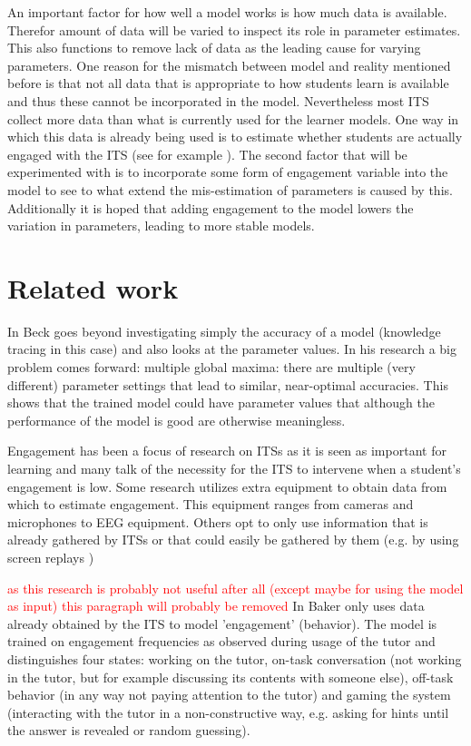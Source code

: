 \documentclass{article}
\newcommand\todo[1]{\textcolor{red}{#1}}
\begin{document}
An important factor for how well a model works is how much data is available. Therefor amount of data will be varied to inspect its role in parameter estimates. This also functions to remove lack of data as the leading cause for varying parameters.
One reason for the mismatch between model and reality mentioned before is that not all data that is appropriate to how students learn is available and thus these cannot be incorporated in the model. Nevertheless most ITS collect more data than what is currently used for the learner models. One way in which this data is already being used is to estimate whether students are actually engaged with the ITS (see for example \cite{offtaskmodel}). The second factor that will be experimented with is to incorporate some form of engagement variable into the model to see to what extend the mis-estimation of parameters is caused by this. Additionally it is hoped that adding engagement to the model lowers the variation in parameters, leading to more stable models.

\section{Related work}
In \cite{knowledgeproblem} Beck goes beyond investigating simply the accuracy of a model (knowledge tracing in this case) and also looks at the parameter values. In his research a big problem comes forward: multiple global maxima: there are multiple (very different) parameter settings that lead to similar, near-optimal accuracies. This shows that the trained model could have parameter values that although the performance of the model is good are otherwise meaningless.

Engagement has been a focus of research on ITSs as it is seen as important for learning and many talk of the necessity for the ITS to intervene when a student's engagement is low. Some research utilizes extra equipment to obtain data from which to estimate engagement. This equipment ranges from cameras and microphones to EEG equipment. Others opt to only use information that is already gathered by ITSs or that could easily be gathered by them (e.g. by using screen replays \cite{})

\todo{as this research is probably not useful after all (except maybe for using the model as input) this paragraph will probably be removed}
In \cite{offtaskmodel} Baker only uses data already obtained by the ITS to model 'engagement' (behavior). The model is trained on engagement frequencies as observed during usage of the tutor and distinguishes four states: working on the tutor, on-task conversation (not working in the tutor, but for example discussing its contents with someone else), off-task behavior (in any way not paying attention to the tutor) and gaming the system (interacting with the tutor in a non-constructive way, e.g. asking for hints until the answer is revealed or random guessing).
\end{document}
